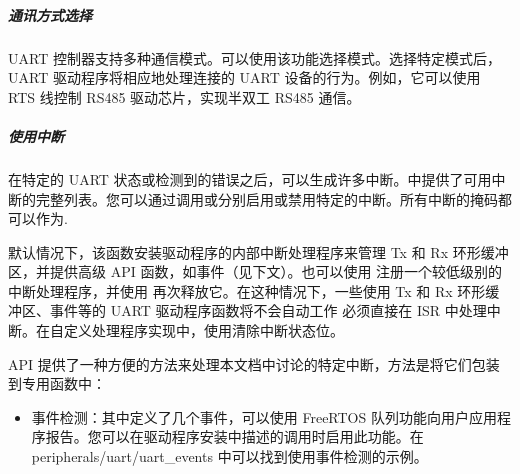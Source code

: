 \documentclass[a4paper,12pt,english]{sphinxmanual}
\begin{document}
{{\subparagraph{通讯方式选择}
\label{\detokenize{exp-esp32/peripherals/uart:id9}}
\sphinxAtStartPar
UART 控制器支持多种通信模式。可以使用该功能选择模式。选择特定模式后，UART 驱动程序将相应地处理连接的 UART 设备的行为。例如，它可以使用 RTS 线控制 RS485 驱动芯片，实现半双工 RS485 通信。

\begin{sphinxVerbatim}[commandchars=\\\{\}]
\end{sphinxVerbatim}


\subparagraph{使用中断}
\label{\detokenize{exp-esp32/peripherals/uart:id10}}
\sphinxAtStartPar
在特定的 UART 状态或检测到的错误之后，可以生成许多中断。中提供了可用中断的完整列表。您可以通过调用或分别启用或禁用特定的中断。所有中断的掩码都可以作为.

\sphinxAtStartPar
默认情况下，该函数安装驱动程序的内部中断处理程序来管理 Tx 和 Rx 环形缓冲区，并提供高级 API 函数，如事件（见下文）。也可以使用 注册一个较低级别的中断处理程序，并使用 再次释放它。在这种情况下，一些使用 Tx 和 Rx 环形缓冲区、事件等的 UART 驱动程序函数将不会自动工作 \sphinxhyphen{} 必须直接在 ISR 中处理中断。在自定义处理程序实现中，使用清除中断状态位。

\sphinxAtStartPar
API 提供了一种方便的方法来处理本文档中讨论的特定中断，方法是将它们包装到专用函数中：
\begin{itemize}
\item {} 
\sphinxAtStartPar
事件检测：其中定义了几个事件，可以使用 FreeRTOS 队列功能向用户应用程序报告。您可以在驱动程序安装中描述的调用时启用此功能。在 peripherals/uart/uart\_events 中可以找到使用事件检测的示例。


\end{itemize}}}
\end{document}
